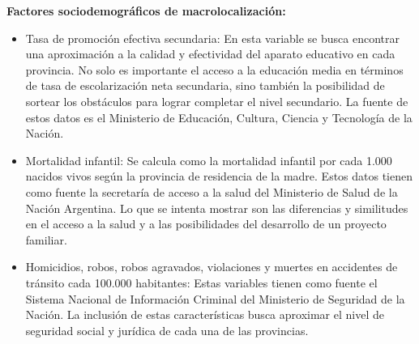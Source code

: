 \documentclass[12pt,a4paper]{article}
\begin{document}
\textbf{Factores sociodemográficos de macrolocalización:}
\begin{itemize}

\item Tasa de promoción efectiva secundaria: En esta variable se busca encontrar una aproximación a la calidad y efectividad del aparato educativo en cada provincia. No solo es importante el acceso a la educación media en términos de tasa de escolarización neta secundaria, sino también la posibilidad de sortear los obstáculos para lograr completar el nivel secundario. La fuente de estos datos es el Ministerio de Educación, Cultura, Ciencia y Tecnología de la Nación.

\item Mortalidad infantil: Se calcula como la mortalidad infantil por cada 1.000 nacidos vivos según la provincia de residencia de la madre. Estos datos tienen como fuente la secretaría de acceso a la salud del Ministerio de Salud de la Nación Argentina. Lo que se intenta mostrar son las diferencias y similitudes en el acceso a la salud y a las posibilidades del desarrollo de un proyecto familiar.

\item Homicidios, robos, robos agravados, violaciones y muertes en accidentes de tránsito cada 100.000 habitantes: Estas variables tienen como fuente el Sistema Nacional de Información Criminal del Ministerio de Seguridad de la Nación. La inclusión de estas características busca aproximar el nivel de seguridad social y jurídica de cada una de las provincias. 
\end{itemize}
\end{document}
